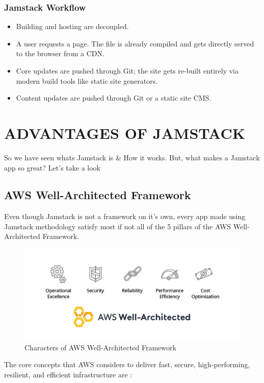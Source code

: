 \documentclass[12pt,a4paper,oneside]{report}
\begin{document}
\subsection{Jamstack Workflow}
\begin{itemize}
\item Building and hosting are decoupled.
\item A user requests a page. The file is already compiled and gets directly served to the browser from a CDN.
\item Core updates are pushed through Git; the site gets re-built entirely via modern build tools like static site generators.
\item Content updates are pushed through Git or a static site CMS.
\end{itemize}


\chapter{ADVANTAGES OF JAMSTACK}
So we have seen whats Jamstack is \& How it works. But, what makes a Jamstack app so great? Let's take a look
\section{AWS Well-Architected Framework}
\par 
Even though Jamstack is not a framework on it's own, every app made using Jamstack methodology satisfy most if not all of the 5 pillars of the AWS Well-Architected Framework. 

\begin{figure}[H]
    \centering
    \includegraphics[scale=.35]{images/aws-well-architected-framework.jpg}
    \caption{Characters of AWS Well-Architected Framework\cite{fcc2}}
\end{figure}

\par 
The core concepts that AWS considers to deliver fast, secure, high-performing, resilient, and efficient infrastructure are :
\end{document}

